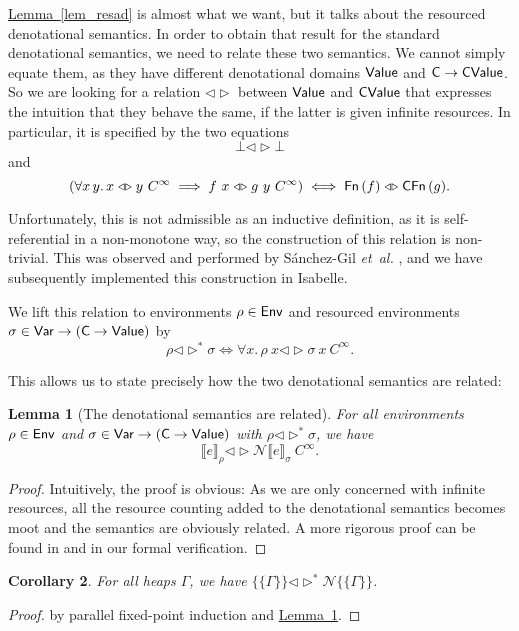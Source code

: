 \documentclass{jfp1}
\newcommand{\myref}[2]{\hyperref[#2]{#1~\ref*{#2}}}
\newtheorem{lemma}{Lemma}
\newtheorem{corollary}[lemma]{Corollary}
\theoremstyle{nonumberbreak}
\newtheorem{proof}{Proof}
\newcommand{\sVar}   {\text{\textsf{Var}}}
\newcommand{\sValue} {\text{\textsf{Value}}}
\newcommand{\sCValue}{\text{\textsf{CValue}}}
\newcommand{\sEnv}   {\text{\textsf{Env}}}
\newcommand{\sC}     {\text{\textsf{C}}}
\newcommand{\sFn}[1]{\text{\textsf{Fn}}\,(#1)}
\newcommand{\sCFn}[1]{\text{\textsf{CFn}}\,(#1)}
\newcommand{\dsem}[2]{\llbracket #1 \rrbracket_{#2}}
\newcommand{\esem}[1]{\{\!\!\!\{#1\}\!\!\!\}}
\newcommand{\dsemr}[2]{\mathcal N\!\llbracket #1 \rrbracket_{#2}}
\newcommand{\esemr}[1]{\mathcal N\!\!\{\!\!\!\{#1\}\!\!\!\}}
\newcommand{\dsim}{\mathrel{\triangleleft\triangleright}}
\newcommand{\dsimheap}{\mathrel{\triangleleft\triangleright^*}}
\begin{document}
\myref{Lemma}{lem_resad} is almost what we want, but it talks about the resourced denotational semantics. In order to obtain that result for the standard denotational semantics, we need to relate these two semantics. We cannot simply equate them, as they have different denotational domains $\sValue$ and $\sC\to\sCValue$. So we are looking for a relation $\dsim$ between $\sValue$ and $\sCValue$ that expresses the intuition that they behave the same, if the latter is given infinite resources. In particular, it is specified by the two equations
\[
\bot \dsim \bot
\]
and
\[
(\forall x\,y.\, x \dsim y~C^\infty \implies f~ x \dsim g~y~C^\infty)
\iff \sFn f \dsim \sCFn g.
\]

Unfortunately, this is not admissible as an inductive definition, as it is self-referential in a non-monotone way, so the construction of this relation is non-trivial. This was observed and performed by S{\'a}nchez-Gil {\em et~al.} , and we have subsequently implemented this construction in Isabelle.

We lift this relation to environments $\rho \in \sEnv$ and resourced environments $\sigma \in \sVar \to (\sC \to \sValue)$ by
\[
\rho \dsimheap \sigma \iff \forall x.\, \rho~x \dsim \sigma~x~C^\infty.
\]

This allows us to state precisely how the two denotational semantics are related:

\begin{lemma}[The denotational semantics are related]
\label{lem_denrel}
For all environments $\rho \in \sEnv$ and $\sigma \in \sVar \to (\sC \to \sValue)$ with $\rho \dsimheap \sigma$, we have
\[
\dsem e \rho \dsim \dsemr e \sigma~{C^\infty}.
\]
\end{lemma}

\begin{proof}
Intuitively, the proof is obvious: As we are only concerned with infinite resources, all the resource counting added to the denotational semantics becomes moot and the semantics are obviously related. A more rigorous proof can be found in \cite{functionspaces} and in our formal verification.
\end{proof}

\begin{corollary}
For all heaps $\Gamma$, we have $\esem{\Gamma}\dsimheap \esemr{\Gamma}$.
\label{lem_denrelheap}
\end{corollary}

\begin{proof}
by parallel fixed-point induction and \myref{Lemma}{lem_denrel}.
\end{proof}
\end{document}
